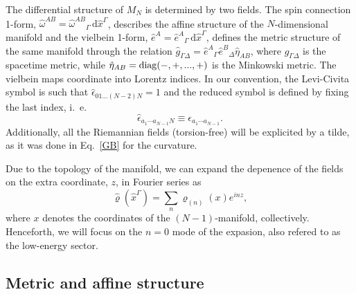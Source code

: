 \documentclass[aps,prd,12pt,superscriptaddress,showpacs,showkeys,reprint,nofootinbib]{revtex4-1}
\begin{document}
The differential structure of $M_N$ is determined by two fields. The spin connection 1-form, $\hat{\omega}^{AB} = \hat{\omega}^{AB}{}_{\Gamma}\,\text{d}\hat{x}^\Gamma$, describes the affine structure of the $N$-dimensional manifold and the vielbein 1-form, $\hat{e}^A=\hat{e}^{A}{}_{\Gamma}\,\text{d}\hat{x}^\Gamma$, defines the metric structure of the same manifold through the relation $\hat{g}_{\Gamma\Delta} = \hat{e}^{A}{}_{\Gamma}\hat{e}^{B}{}_{\Delta}\hat{\eta}_{AB}$, where $\hat{g}_{\Gamma\Delta}$ is the spacetime metric, while $\hat{\eta}_{AB} = \operatorname{diag}(-,+,...,+)$ is the Minkowski metric. The vielbein maps coordinate into Lorentz indices.
In our convention, the Levi-Civita symbol is such that $\hat{\epsilon}_{01...(N-2)N} = 1$ and the reduced symbol is defined by fixing the last index, i.~e.
\[\hat{\epsilon}_{a_1 \cdots a_{N-1} N} \equiv \epsilon_{a_1 \cdots a_{N-1}}.\]
Additionally, all the Riemannian fields (torsion-free) will be explicited by a tilde, as it was done in Eq.~\eqref{GB} for the curvature.

Due to the topology of the manifold, we can expand the depenence of the fields on the extra coordinate, $z$, in Fourier series as  
\begin{equation}
  \label{Fourier}
  \hat{\varrho}(\hat{x}^\Gamma)=\sum_n\varrho_{(n)}(x)e^{i n z},
\end{equation}
where $x$ denotes the coordinates of the $(N-1)$-manifold, collectively. Henceforth, we will focus on the $n=0$ mode of the expasion, also refered to as the low-energy sector.

\subsection{Metric and affine structure}
\end{document}
